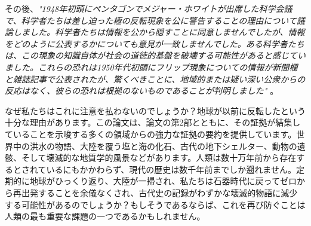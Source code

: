 \documentclass[10pt,twocolumn,letterpaper]{article}
\begin{document}
その後、\textit{"1948年初頭にペンタゴンでメジャー・ホワイトが出席した科学会議で、科学者たちは差し迫った極の反転現象を公に警告することの理由について議論しました。科学者たちは情報を公から隠すことに同意しませんでしたが、情報をどのように公表するかについても意見が一致しませんでした。ある科学者たちは、この現象の知識自体が社会の道徳的基盤を破壊する可能性があると感じていました。これらの恐れは1950年代初頭にフリップ現象についての情報が新聞欄と雑誌記事で公表されたが、驚くべきことに、地域的または疑い深い公衆からの反応はなく、彼らの恐れは根拠のないものであることが判明しました"} \cite{138,139}。

なぜ私たちはこれに注意を払わないのでしょうか？地球が以前に反転したという十分な理由があります。この論文は、論文の第2部とともに、その証拠が結集していることを示唆する多くの領域からの強力な証拠の要約を提供しています。世界中の洪水の物語、大陸を覆う塩と海の化石、古代の地下シェルター、動物の遺骸、そして壊滅的な地質学的風景などがあります。人類は数十万年前から存在するとされているにもかかわらず、現代の歴史は数千年前までしか遡れません。定期的に地球がひっくり返り、大陸が一掃され、私たちは石器時代に戻ってゼロから再出発することを余儀なくされ、古代史の記録がわずかな壊滅的物語に減少する可能性があるのでしょうか？もしそうであるならば、これを再び防ぐことは人類の最も重要な課題の一つであるかもしれません。
\end{document}
